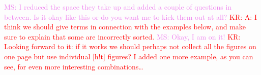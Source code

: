 \documentclass[letterpaper,11pt]{article}
\newcommand{\KR}[1]{\textcolor{red}{KR: #1}}
\newcommand{\MS}[1]{\textcolor{violet}{MS: #1}}
\begin{document}
\MS{I reduced the space they take up and added a couple of questions in between. Is it okay like
  this or do you want me to kick them out at all?}  \KR{A: I think we should give terms in
  connection with the examples below, and make sure to explain that some are incorrectly sorted.}
\MS{Okay, I am on it!} \KR{Looking forward to it: if it works we should perhaps not collect all the
  figures on one page but use individual [h!t] figures? I added one more example, as you can see, for
even more interesting combinations…}
\end{document}
